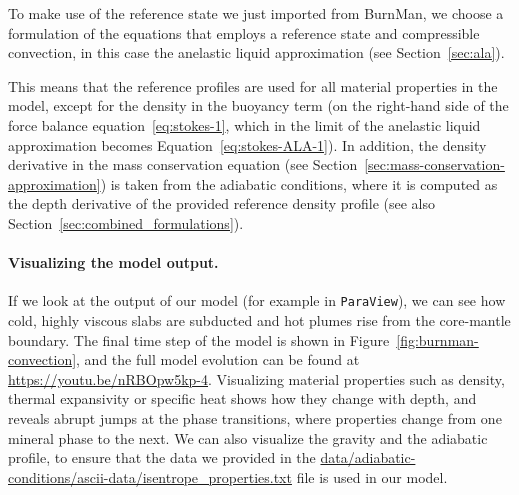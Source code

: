 \documentclass{article}
\begin{document}
To make use of the reference state we just imported from BurnMan, we choose a formulation of the 
equations that employs a reference state and compressible convection, in this case the anelastic 
liquid approximation (see Section~\ref{sec:ala}). 

This means that the reference profiles are used for all material properties in the model, except for
the density in the buoyancy term (on the right-hand side of the force balance equation~\eqref{eq:stokes-1}, 
which in the limit of the anelastic liquid approximation becomes Equation~\eqref{eq:stokes-ALA-1}). 
In addition, the density derivative in the mass conservation equation 
(see Section~\ref{sec:mass-conservation-approximation}) is taken from the adiabatic 
conditions, where it is computed as the depth derivative of the provided reference density profile
(see also Section~\ref{sec:combined_formulations}).

\paragraph{Visualizing the model output.}
If we look at the output of our model (for example in \texttt{ParaView}), we can see how cold, highly 
viscous slabs are subducted and hot plumes rise from the core-mantle boundary. The final time step of 
the model is shown in Figure~\ref{fig:burnman-convection}, and the full model evolution can be found 
at \url{https://youtu.be/nRBOpw5kp-4}.
Visualizing material properties such as density, thermal expansivity or specific heat shows how they
change with depth, and reveals abrupt jumps at the phase transitions, where properties change from one
mineral phase to the next. We can also visualize the gravity and the adiabatic profile, to ensure that
the data we provided in the \url{data/adiabatic-conditions/ascii-data/isentrope_properties.txt} file
is used in our model. 
\end{document}
